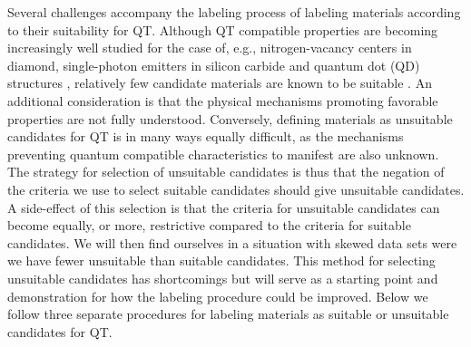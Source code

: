 \documentclass[superscriptaddress,unsortedaddress,
 amsmath,amssymb,
 aps,
]{revtex4-2}
\begin{document}
Several challenges accompany the labeling process of labeling materials according to their suitability for QT. 
Although QT compatible properties are becoming increasingly well studied for the case of, e.g., nitrogen-vacancy centers in diamond, single-photon emitters in silicon carbide and quantum dot (QD) structures \cite{Doherty_2013,Bathen2021,Aharonovich_2016}, relatively few candidate materials are known to be suitable \cite{Atatuere2018,Zhang2020}. An additional consideration is that the physical mechanisms promoting favorable properties are not fully understood. 
Conversely, defining materials as unsuitable candidates for QT is in many ways equally difficult, as the mechanisms preventing quantum compatible characteristics to manifest are also unknown. 
The strategy for selection of unsuitable candidates is thus that the negation of the criteria we use to select suitable candidates should give unsuitable candidates.
A side-effect of this selection is that the criteria for unsuitable candidates can become equally, or more, restrictive compared to the criteria for suitable candidates. 
We will then find ourselves in a situation with skewed data sets were we have fewer unsuitable than suitable candidates. 
This method for selecting unsuitable candidates has shortcomings but will serve as a starting point and demonstration for how the labeling procedure could be improved. 
Below we follow three separate procedures for labeling materials as suitable or unsuitable candidates for QT. 
\end{document}
